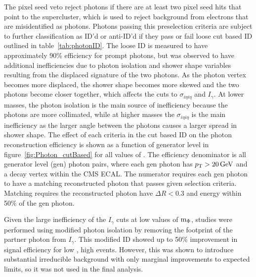 The pixel seed veto reject photons if there are at least two pixel seed hits that point to the supercluster, which is used to reject background from electrons that are misidentified as photons. Photons passing this preselection criteria are subject to further classification as ID'd or anti-ID'd if they pass or fail loose cut based ID outlined in table~\ref{tab:photonID}. The loose ID is measured to have approximately 90\% efficiency for prompt photons, but was observed to have additional inefficiencies due to photon isolation and shower shape variables resulting from the displaced signature of the two photons. As the photon vertex becomes more displaced, the shower shape becomes more skewed and the two photons become closer together, which affects the cuts to $\sigma_{i\eta i\eta}$ and $I_\gamma$. At lower masses, the photon isolation is the main source of inefficiency because the photons are more collimated, while at higher masses the $\sigma_{i\eta i\eta}$ is the main inefficiency as the larger angle between the photons causes a larger spread in shower shape. The effect of each criteria in the cut based ID on the photon reconstruction efficiency is shown as a function of generator level \lxy in figure~\ref{fig:Photon_cutBased} for all values of \mphi. The efficiency denominator is all generator level (gen) photon pairs, where each gen photon has $p_{\mathrm{T}}>20\,\text{Ge\hspace{-.08em}V}$ and a decay vertex within the CMS ECAL. The numerator requires each gen photon to have a matching reconstructed photon that passes given selection criteria. Matching requires the reconstructed photon have $\Delta R < 0.3$ and energy within 50\% of the gen photon.

Given the large inefficiency of the $I_\gamma$ cuts at low values of $\text{m}_\Phi$, studies were performed using modified photon isolation by removing the footprint of the partner photon from $I_\gamma$. This modified ID showed up to 50\% improvement in signal efficiency for low \mphi, high \lxy events. However, this was shown to introduce substantial irreducible background with only marginal improvements to expected limits, so it was not used in the final analysis.

